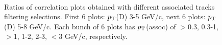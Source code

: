 \begin{figure}[h]
 \\
 \caption{Ratios of correlation plots obtained with different associated tracks filtering selections. First 6 plots: $p_{\rm T}$(D) 3-5 GeV/c, next 6 plots: $p_{\rm T}$(D) 5-8 GeV/c. Each bunch of 6 plots has $p_{\rm T}$(assoc) of $>$0.3, 0.3-1, $>$1, 1-2, 2-3, $<$3 GeV/c, respectively.}
 \label{fig:Syst_EffTrack}
\end{figure}

